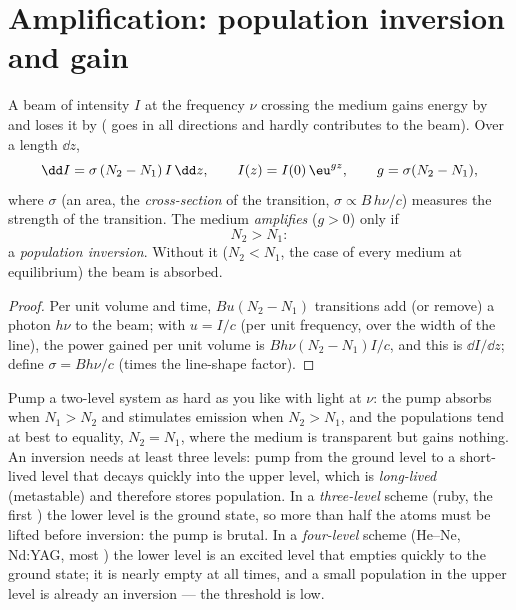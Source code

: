\section{Amplification: population inversion and gain}

\begin{proposition}\label{prop:b2:laser:gain}
A beam of intensity $I$ at the frequency $\nu$ crossing the medium
gains energy by  and loses it by 
( goes in all directions and hardly contributes to
the beam). Over a length $\dd z$,
\[
\dd I = \sigma\,(N_2 - N_1)\,I\,\dd z, \qquad
I(z) = I(0)\,\eu^{g z}, \qquad g = \sigma(N_2 - N_1),
\]
where $\sigma$ (an area, the \emph{cross-section} of the transition, $\sigma \propto B\,h\nu/c$) measures
the strength of the transition. The medium \emph{amplifies} ($g > 0$)
only if
\[
N_2 > N_1 :
\]
a \emph{population inversion}. Without it
($N_2 < N_1$, the case of every medium at equilibrium) the beam is
absorbed.
\end{proposition}

\begin{proof}
Per unit volume and time, $B u (N_2 - N_1)$ transitions add (or remove)
a photon $h\nu$ to the beam; with $u = I/c$ (per unit frequency, over
the width of the line), the power gained per unit volume is
$B h\nu (N_2 - N_1) I/c$, and this is $\dd I/\dd z$; define $\sigma =
Bh\nu/c$ (times the line-shape factor).
\end{proof}

\begin{remark}\label{rem:b2:laser:twolevel}
Pump a two-level system as hard as you like with light at $\nu$: the
pump absorbs when $N_1 > N_2$ and stimulates emission when $N_2 > N_1$,
and the populations tend at best to equality, $N_2 = N_1$, where the
medium is transparent but gains nothing. An inversion needs at least
three levels: pump from the ground level to a short-lived level that
decays quickly into the upper  level, which is \emph{long-lived}
(metastable) and therefore stores population. In a
\emph{three-level} scheme (ruby, the first
) the lower  level is the ground state, so more than half
the atoms must be lifted before inversion: the pump is brutal. In a
\emph{four-level} scheme (He--Ne, Nd:YAG, most
) the lower  level is an excited level that empties quickly
to the ground state; it is nearly empty at all times, and a small
population in the upper level is already an inversion --- the threshold
is low.
\end{remark}

